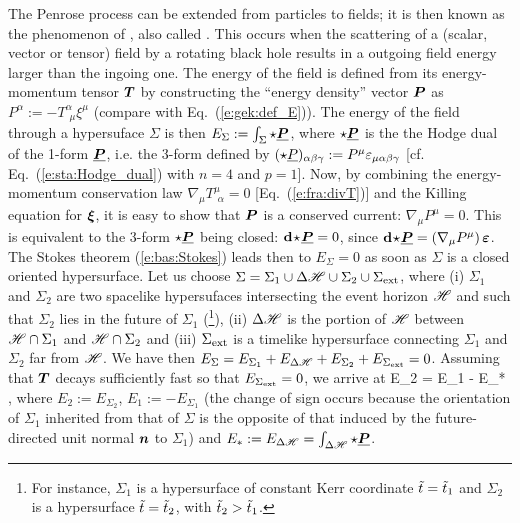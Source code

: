 The Penrose process can be extended from particles to fields; it is then
known as the phenomenon of , also
called .
This occurs when the scattering of a (scalar, vector or tensor)
field by a rotating black hole results in a outgoing field energy larger than the ingoing one.
The energy of the field is defined from its energy-momentum tensor $\bm{T}$ by constructing
the ``energy density'' vector $\bm{P}$ as $P^\alpha := - T^\alpha_{\ \, \mu} \xi^\mu$
(compare with Eq.~(\ref{e:gek:def_E})). The energy of the field through a hypersuface
$\Sigma$ is then $E_\Sigma := \int_\Sigma \star\underline{\bm{P}}$, where $\star\underline{\bm{P}}$ is the
the Hodge dual of the 1-form $\underline{\bm{P}}$, i.e. the 3-form defined by
$(\star \underline{P})_{\alpha\beta\gamma} := P^\mu \varepsilon_{\mu\alpha\beta\gamma}$
[cf. Eq.~(\ref{e:sta:Hodge_dual}) with $n=4$ and $p=1$]. Now,
by combining the energy-momentum conservation law $\nabla_\mu T^\mu_{\ \, \alpha} = 0$
[Eq.~(\ref{e:fra:divT})] and the Killing equation for $\bm{\xi}$,
it is easy to show that $\bm{P}$ is a conserved current: $\nabla_\mu P^\mu = 0$.
This is equivalent to the 3-form $\star\underline{\bm{P}}$ being closed: $\mathbf{d}\!\star\!\underline{\bm{P}} = 0$,
since $\mathbf{d}\!\star\!\underline{\bm{P}} = (\nabla_\mu P^\mu) \, \bm{\varepsilon}$.
The Stokes theorem (\ref{e:bas:Stokes}) leads then to
$E_{\Sigma}= 0$ as soon as $\Sigma$ is a closed oriented hypersurface.
Let us choose $\Sigma = \Sigma_1 \cup \Delta \mathscr{H} \cup \Sigma_2 \cup \Sigma_{\rm ext}$,
where (i) $\Sigma_1$ and $\Sigma_2$ are two spacelike hypersufaces intersecting the
event horizon $\mathscr{H}$ and such that $\Sigma_2$ lies in the future of $\Sigma_1$ (\footnote{For instance,
$\Sigma_1$ is a hypersurface of constant Kerr coordinate ${\tilde t} = {\tilde t}_1$ and
$\Sigma_2$ is a hypersurface ${\tilde t} = {\tilde t}_2$, with ${\tilde t}_2 > {\tilde t}_1$.}),
(ii) $\Delta\mathscr{H}$ is the portion of $\mathscr{H}$ between $\mathscr{H}\cap\Sigma_1$ and
$\mathscr{H}\cap\Sigma_2$ and (iii) $\Sigma_{\rm ext}$ is a timelike hypersurface
connecting $\Sigma_1$ and $\Sigma_2$ far from $\mathscr{H}$.
We have then $E_\Sigma = E_{\Sigma_1} + E_{\Delta\mathscr{H}} + E_{\Sigma_2} + E_{\Sigma_{\rm ext}} = 0$.
Assuming that $\bm{T}$ decays sufficiently fast so that $E_{\Sigma_{\rm ext}} = 0$,
we arrive at
\be
    E_2 = E_1 - E_* ,
\ee
where $E_2 := E_{\Sigma_2}$, $E_1 := - E_{\Sigma_1}$ (the change of sign
occurs because the orientation of $\Sigma_1$ inherited from that of $\Sigma$
is the opposite of that induced by the future-directed unit normal $\bm{n}$
to $\Sigma_1$) and $E_* :=  E_{\Delta\mathscr{H}} = \int_{\Delta\mathscr{H}} \star\underline{\bm{P}}$.
